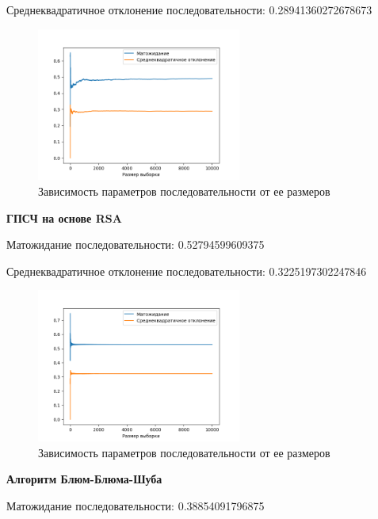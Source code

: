 \documentclass[spec, och, labwork]{shiza}
\begin{document}
\begin{enumerate}
  Среднеквадратичное отклонение последовательности: 0.28941360272678673
  \begin{figure}[H]
    \centering
    \includegraphics[width=0.6\textwidth]{pic/rc}
    \caption{Зависимость параметров последовательности от ее размеров}
    \label{fig:img1}
  \end{figure}
  \begin{center}
    \textbf{ГПСЧ на основе RSA}
  \end{center}
  Матожидание последовательности: 0.52794599609375

  Среднеквадратичное отклонение последовательности: 0.3225197302247846

  \begin{figure}[H]
    \centering
    \includegraphics[width=0.6\textwidth]{pic/rsa}
    \caption{Зависимость параметров последовательности от ее размеров}
    \label{fig:img1}
  \end{figure}
  \begin{center}
    \textbf{Алгоритм Блюм-Блюма-Шуба}
  \end{center}
  Матожидание последовательности: 0.38854091796875


\end{enumerate}
\end{document}
